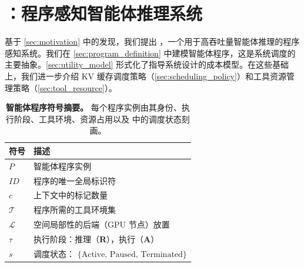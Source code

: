 \vspace{-2mm}
\section{\ouralg：程序感知智能体推理系统}
\label{sec:thunder_agent}

基于 \autoref{sec:motivation} 中的发现，我们提出 \ouralg，一个用于高吞吐量智能体推理的程序感知系统。我们在 \autoref{sec:program_definition} 中建模智能体程序，这是系统调度的主要抽象。\autoref{sec:utility_model} 形式化了指导系统设计的成本模型。在这些基础上，我们进一步介绍 KV 缓存调度策略（\autoref{sec:scheduling_policy}）和工具资源管理策略（\autoref{sec:tool_resource}）。

\begin{table}[ht]
\caption{\textbf{智能体程序符号摘要。} 每个程序实例由其身份、执行阶段、工具环境、资源占用以及 \ouralg 中的调度状态刻画。}
\vspace{-1.5em}
\label{tab:notations}
\begin{center}
\small
\renewcommand{\arraystretch}{1.1}
\begin{tabularx}{\columnwidth}{lX}
\toprule
\textbf{符号} & \textbf{描述} \\
\midrule
$P$ & 智能体程序实例 \\
$\mathit{ID}$ & 程序的唯一全局标识符 \\
$c$ & 上下文中的标记数量 \\
$\mathcal{T}$ & 程序所需的工具环境集 \\
$\mathcal{L}$ & 空间局部性的后端（GPU 节点）放置 \\
$\tau$ & 执行阶段：推理（\textbf{R}），执行（\textbf{A}） \\
$s$ & 调度状态： $\{\text{Active, Paused, Terminated}\}$ \\
\bottomrule
\end{tabularx}
\end{center}
\vspace{-8mm}
\end{table}

